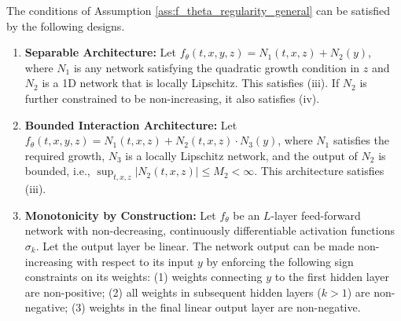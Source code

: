 \documentclass[10pt,a4paper]{amsart}
\newcommand{\abs}[1]{\left\lvert#1\right\rvert}
\begin{document}
\begin{proposition}
\label{prop:architectures}
The conditions of Assumption \ref{ass:f_theta_regularity_general} can be satisfied by the following designs.
\begin{enumerate}[label=(\alph*)]
    \item \textbf{Separable Architecture:} Let $f_\theta(t,x,y,z) = N_1(t,x,z) + N_2(y)$, where $N_1$ is any network satisfying the quadratic growth condition in $z$ and $N_2$ is a 1D network that is locally Lipschitz. This satisfies (iii). If $N_2$ is further constrained to be non-increasing, it also satisfies (iv).

    \item \textbf{Bounded Interaction Architecture:} Let $f_\theta(t,x,y,z) = N_1(t,x,z) + N_2(t,x,z) \cdot N_3(y)$, where $N_1$ satisfies the required growth, $N_3$ is a locally Lipschitz network, and the output of $N_2$ is bounded, i.e., $\sup_{t,x,z} \abs{N_2(t,x,z)} \le M_2 < \infty$. This architecture satisfies (iii).

    \item \textbf{Monotonicity by Construction:} Let $f_\theta$ be an $L$-layer feed-forward network with non-decreasing, continuously differentiable activation functions $\sigma_k$. Let the output layer be linear. The network output can be made non-increasing with respect to its input $y$ by enforcing the following sign constraints on its weights: (1) weights connecting $y$ to the first hidden layer are non-positive; (2) all weights in subsequent hidden layers ($k>1$) are non-negative; (3) weights in the final linear output layer are non-negative.
\end{enumerate}
\end{proposition}
\end{document}

